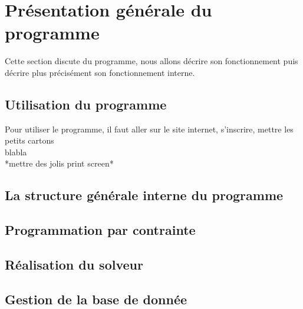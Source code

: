 \section{Présentation générale du programme}
Cette section discute du programme, nous allons décrire son fonctionnement puis décrire plus précisément son fonctionnement interne.


\subsection{Utilisation du programme}

Pour utiliser le programme, il faut aller sur le site internet, s'inscrire, mettre les petits cartons \\

blabla\\

*mettre des jolis print screen*\\

\subsection{La structure générale interne du programme}

\subsection{Programmation par contrainte}

\subsection{Réalisation du solveur} 

\subsection{Gestion de la base de donnée}


